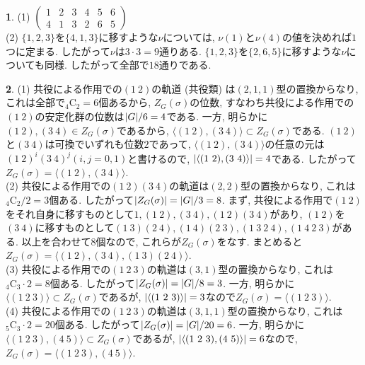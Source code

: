 \documentclass{article}
\theoremstyle{definition}
\newtheorem{ans}{}
\numberwithin{ans}{subsection}
\DeclarePairedDelimiter{\abs}{\lvert}{\rvert}
\begin{document}
\begin{ans}
  (1) $\begin{pmatrix*}
    1 & 2 & 3 & 4 & 5 & 6 \\
    4 & 1 & 3 & 2 & 6 & 5
  \end{pmatrix*}$\\
  (2) $\{1, 2, 3\}$を$\{4, 1, 3\}$に移すような$\nu$については,
  $\nu(1)$と$\nu(4)$の値を決めれば$1$つに定まる. したがって$\nu$は$3 \cdot 3 = 9$通りある.
  $\{1, 2, 3\}$を$\{2, 6, 5\}$に移すような$\nu$についても同様. したがって全部で$18$通りである.
\end{ans}

\begin{ans}
  (1) 共役による作用での$(1\ 2)$の軌道 (共役類) は$(2, 1, 1)$型の置換からなり, これは全部で${}_4\mathrm{C}_2 = 6$個あるから,
  $Z_G(\sigma)$の位数, すなわち共役による作用での$(1\ 2)$の安定化群の位数は$\abs{G}/6 = 4$である.
  一方, 明らかに$(1\ 2), (3\ 4) \in Z_G(\sigma)$であるから,
  $\langle (1\ 2), (3\ 4) \rangle \subset Z_G(\sigma)$である.
  $(1\ 2)$と$(3\ 4)$は可換でいずれも位数$2$であって, $\langle (1\ 2), (3\ 4) \rangle$の任意の元は$(1\ 2)^i(3\ 4)^j (i, j = 0, 1)$と書けるので,
  $\abs{\langle (1\ 2), (3\ 4) \rangle} = 4$である.
  したがって$Z_G(\sigma) = \langle (1\ 2), (3\ 4) \rangle$.\\
  (2) 共役による作用での$(1\ 2)(3\ 4)$の軌道は$(2, 2)$型の置換からなり, これは${}_4\mathrm{C}_2/2 = 3$個ある.
  したがって$\abs{Z_G(\sigma)} = \abs{G}/3 = 8$.
  まず, 共役による作用で$(1\ 2)$をそれ自身に移すものとして$1, (1\ 2), (3\ 4), (1\ 2)(3\ 4)$があり,
  $(1\ 2)$を$(3\ 4)$に移すものとして$(1\ 3)(2\ 4), (1\ 4)(2\ 3), (1\ 3\ 2\ 4), (1\ 4\ 2\ 3)$がある.
  以上を合わせて$8$個なので, これらが$Z_G(\sigma)$をなす.
  まとめると$Z_G(\sigma) = \langle (1\ 2), (3\ 4), (1\ 3)(2\ 4) \rangle$.\\
  (3) 共役による作用での$(1\ 2\ 3)$の軌道は$(3, 1)$型の置換からなり, これは${}_4\mathrm{C}_3 \cdot 2 = 8$個ある.
  したがって$\abs{Z_G(\sigma)} = \abs{G}/8 = 3$.
  一方, 明らかに$\langle (1\ 2\ 3) \rangle \subset Z_G(\sigma)$であるが,
  $\abs{\langle (1\ 2\ 3) \rangle} = 3$なので$Z_G(\sigma) = \langle (1\ 2\ 3) \rangle$.\\
  (4) 共役による作用での$(1\ 2\ 3)$の軌道は$(3, 1, 1)$型の置換からなり, これは${}_5\mathrm{C}_3 \cdot 2 = 20$個ある.
  したがって$\abs{Z_G(\sigma)} = \abs{G}/20 = 6$.
  一方, 明らかに$\langle (1\ 2\ 3), (4\ 5) \rangle \subset Z_G(\sigma)$であるが,
  $\abs{\langle (1\ 2\ 3), (4\ 5) \rangle} = 6$なので,
  $Z_G(\sigma) = \langle (1\ 2\ 3), (4\ 5) \rangle$.\\

\end{ans}
\end{document}
